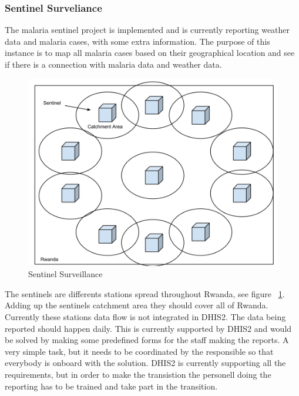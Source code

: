 \subsubsection{Sentinel Surveliance}
The malaria sentinel project is implemented and is currently reporting weather data and malaria cases, with some extra information.
The purpose of this instance is to map all malaria cases based on their geographical location and see if there is a connection with malaria data and weather data.  
\begin{figure}
\centering
\includegraphics[width=12cm]{empirical/images/sentinel_surveliance}
\caption{Sentinel Surveillance}
\label{fig:sentinel_surveliance}
\end{figure}
The sentinels are differents stations spread throughout Rwanda, see figure ~\ref{fig:sentinel_surveliance}. Adding up the sentinels catchment area they should cover all of Rwanda. 
Currently these stations data flow is not integrated in DHIS2. The data being reported should happen daily. This is currently supported by DHIS2 and would be solved by making some predefined forms for the staff making the reports.
A very simple task, but it needs to be coordinated by the responsible so that everybody is onboard with the solution.
DHIS2 is currently supporting all the requirements, but in order to make the transistion the personell doing the reporting has to be trained and take part in the transition.
